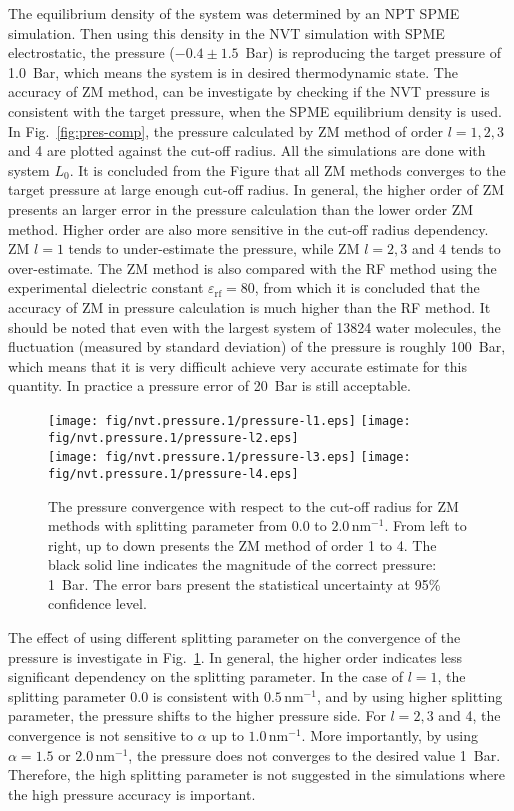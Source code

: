 \documentclass[aip,jcp,a4paper,preprint,unsortedaddress,onecolumn,fleqn]{revtex4-1}
\newcommand{\systemla}{L_0}
\begin{document}
The equilibrium density of the system was determined by an NPT SPME
simulation.  Then using this density in the NVT simulation with SPME electrostatic, the
pressure ($-0.4\pm 1.5$~Bar) is reproducing the target pressure of
1.0~Bar, which means the system is in desired thermodynamic state.  The accuracy of ZM method, can be investigate by checking if
the NVT pressure is consistent with the target pressure, when the SPME equilibrium density is used.  In
Fig.~\ref{fig:pres-comp}, the pressure calculated by ZM method of
order $l=1,2,3$ and 4 are plotted against the cut-off radius.
All the  simulations are done with system $\systemla$.
It is concluded from the Figure that all ZM methods converges to the
target pressure at large enough cut-off radius.
In general, the higher order of ZM presents an larger error in the pressure calculation than
the lower order ZM method.
Higher order are also more sensitive in the  cut-off radius dependency.
ZM $l=1$ tends to under-estimate the pressure, while ZM $l=2,3$ and 4 tends to over-estimate.
The ZM method is also compared with
the RF method using the experimental dielectric constant $\varepsilon_{\textrm{rf}} = 80$, 
from which it is concluded that the accuracy of ZM in pressure calculation is much higher
than the RF method.
It should be noted that even with the largest system of 13824 water molecules,
the fluctuation (measured by standard deviation) of the pressure is roughly 100~Bar, which means that it is
very difficult achieve very accurate estimate for this quantity. In practice a pressure error of 20~Bar is
still acceptable. 

\begin{figure}
  \centering
  \texttt{[image: fig/nvt.pressure.1/pressure-l1.eps]}
  \texttt{[image: fig/nvt.pressure.1/pressure-l2.eps]}\\
  \texttt{[image: fig/nvt.pressure.1/pressure-l3.eps]}
  \texttt{[image: fig/nvt.pressure.1/pressure-l4.eps]}
  \caption{The pressure convergence with respect to the cut-off radius
    for ZM methods with  splitting parameter from $0.0$ to $2.0\,\textrm{nm}^{-1}$.
    From left to right, up to down presents the ZM method of order 1 to 4.
    The black solid line indicates the magnitude  of the correct pressure: 1~Bar.
    The error bars present the statistical uncertainty at 95\% confidence level.
  }
  \label{fig:pres-l1}
\end{figure}

The effect of using different splitting parameter on the convergence
of the pressure is investigate in Fig.~\ref{fig:pres-l1}.
In general, the higher order indicates less significant dependency on the splitting parameter.
In the case of $l=1$, the splitting parameter 0.0 is consistent with  $0.5\,\textrm{nm}^{-1}$, and
by using higher splitting parameter, the pressure shifts to the higher pressure side.
For $l=2,3$ and 4, the convergence is not sensitive to $\alpha$ up to  $1.0\,\textrm{nm}^{-1}$.
More importantly,  by using $\alpha = 1.5$ or $2.0\,\textrm{nm}^{-1}$,
the pressure does not converges to the desired value 1~Bar. Therefore, the high splitting parameter
is not suggested in the simulations where the high pressure accuracy is important.
\end{document}
